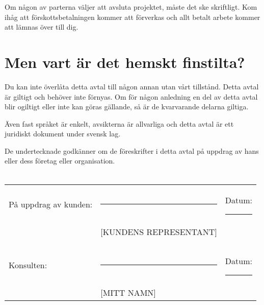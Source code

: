 \documentclass[10pt,a4paper,parskip]{scrartcl}
\begin{document}
Om någon av parterna väljer att avsluta projektet, måste det ske skriftligt.
Kom ihåg att förskottsbetalningen kommer att förverkas och allt betalt arbete
kommer att lämnas över till dig.

\section{Men vart är det hemskt finstilta?}
Du kan inte överlåta detta avtal till någon annan utan vårt tillstånd. Detta
avtal är giltigt och behöver inte förnyas. Om för någon anledning en del av
detta avtal blir ogiltigt eller inte kan göras gällande, så är de kvarvarande
delarna giltiga.

Även fast språket är enkelt, avsikterna är allvarliga och detta avtal är ett
juridiskt dokument under svensk lag.


\vspace{1cm}

\noindent De undertecknade godkänner om de föreskrifter i detta avtal på
uppdrag av hans eller dess företag eller organisation.\\\\

\noindent \begin{tabular}{l l l}
På uppdrag av kunden: & \rule{6cm}{.2pt}       & Datum: \rule{2.4cm}{.2pt}\\
                      & [KUNDENS REPRESENTANT] & \\\\\\
Konsulten:            & \rule{6cm}{.2pt}       & Datum: \rule{2.4cm}{.2pt}\\
                      & [MITT NAMN]            & \\
\end{tabular}
\end{document}
